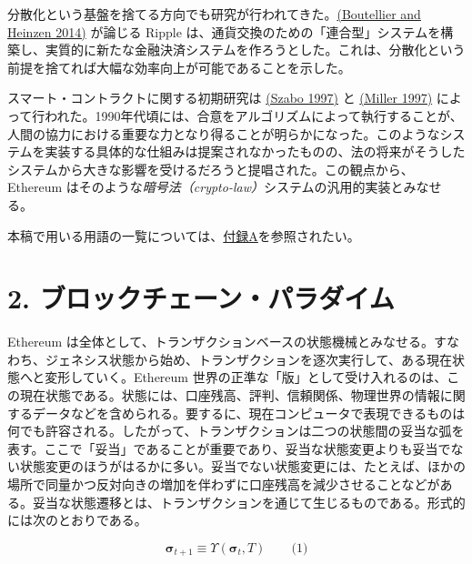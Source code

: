 \documentclass[
]{ltjsarticle}
\begin{document}
分散化という基盤を捨てる方向でも研究が行われてきた。\protect\hyperlink{ref-boutellier2014pirates}{(Boutellier
and Heinzen 2014)} が論じる Ripple
は、通貨交換のための「連合型」システムを構築し、実質的に新たな金融決済システムを作ろうとした。これは、分散化という前提を捨てれば大幅な効率向上が可能であることを示した。

スマート・コントラクトに関する初期研究は
\protect\hyperlink{ref-szabo1997formalizing}{(Szabo 1997)} と
\protect\hyperlink{ref-miller1997future}{(Miller 1997)}
によって行われた。1990年代頃には、合意をアルゴリズムによって執行することが、人間の協力における重要な力となり得ることが明らかになった。このようなシステムを実装する具体的な仕組みは提案されなかったものの、法の将来がそうしたシステムから大きな影響を受けるだろうと提唱された。この観点から、Ethereum
はそのような\emph{暗号法（crypto-law）}システムの汎用的実装とみなせる。

本稿で用いる用語の一覧については、\protect\hyperlink{ch:Terminology}{付録A}を参照されたい。

\protect\hypertarget{ch:overview}{}{}

\hypertarget{ux30d6ux30edux30c3ux30afux30c1ux30a7ux30fcux30f3ux30d1ux30e9ux30c0ux30a4ux30e0}{%
\section{2.
ブロックチェーン・パラダイム}\label{ux30d6ux30edux30c3ux30afux30c1ux30a7ux30fcux30f3ux30d1ux30e9ux30c0ux30a4ux30e0}}

Ethereum
は全体として、トランザクションベースの状態機械とみなせる。すなわち、ジェネシス状態から始め、トランザクションを逐次実行して、ある現在状態へと変形していく。Ethereum
世界の正準な「版」として受け入れるのは、この現在状態である。状態には、口座残高、評判、信頼関係、物理世界の情報に関するデータなどを含められる。要するに、現在コンピュータで表現できるものは何でも許容される。したがって、トランザクションは二つの状態間の妥当な弧を表す。ここで「妥当」であることが重要であり、妥当な状態変更よりも妥当でない状態変更のほうがはるかに多い。妥当でない状態変更には、たとえば、ほかの場所で同量かつ反対向きの増加を伴わずに口座残高を減少させることなどがある。妥当な状態遷移とは、トランザクションを通じて生じるものである。形式的には次のとおりである。

\protect\hypertarget{Upsilon_state_transition}{}{}

\protect\hypertarget{eq-1}{}{}

\[\boldsymbol{\sigma}_{t+1} \equiv \Upsilon(\boldsymbol{\sigma}_{t}, T) \qquad \text{(1)}\]
\end{document}
